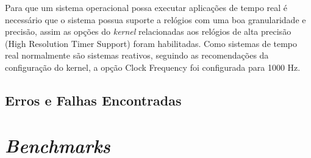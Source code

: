 Para que um sistema operacional possa executar aplicações de tempo real é necessário que o sistema possua suporte a relógios com uma boa granularidade e precisão, assim as opções do \textit{kernel} relacionadas aos relógios de alta precisão (High Resolution Timer Support) foram habilitadas. Como sistemas de tempo real normalmente são sistemas reativos, seguindo as recomendações da configuração do kernel, a opção Clock Frequency foi configurada para 1000 Hz.

\subsection{Erros e Falhas Encontradas}

\section{\textit{Benchmarks}}
